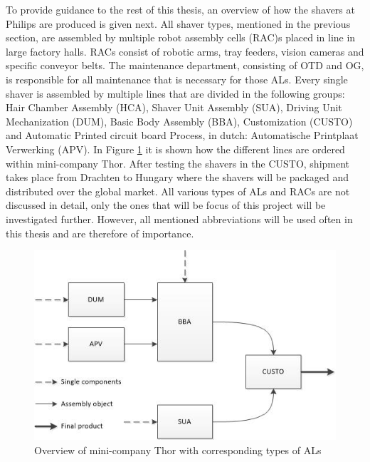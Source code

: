 To provide guidance to the rest of this thesis, an overview of how the shavers at Philips are produced is given next. All shaver types, mentioned in the previous section, are assembled by multiple robot assembly cells (RAC)s placed in line in large factory halls. RACs consist of robotic arms, tray feeders, vision cameras and specific conveyor belts. The maintenance department, consisting of OTD and OG, is responsible for all maintenance that is necessary for those ALs. Every single shaver is assembled by multiple lines that are divided in the following groups: Hair Chamber Assembly (HCA), Shaver Unit Assembly (SUA), Driving Unit Mechanization (DUM), Basic Body Assembly (BBA), Customization (CUSTO) and Automatic Printed circuit board Process, in dutch: Automatische Printplaat Verwerking (APV). In Figure \ref{fig:assemblyline} it is shown how the different lines are ordered within mini-company Thor. After testing the shavers in the CUSTO, shipment takes place from Drachten to Hungary where the shavers will be packaged and distributed over the global market. All various types of ALs and RACs are not discussed in detail, only the ones that will be focus of this project will be investigated further. However, all mentioned abbreviations will be used often in this thesis and are therefore of importance.
\begin{figure}[ht]
\centering
\includegraphics[width=\textwidth]{Figures/assemblyline_Thor}
\caption[Overview of mini-company Thor with corresponding types of ALs]{Overview of mini-company Thor with corresponding types of ALs}
\label{fig:assemblyline}
\end{figure}

